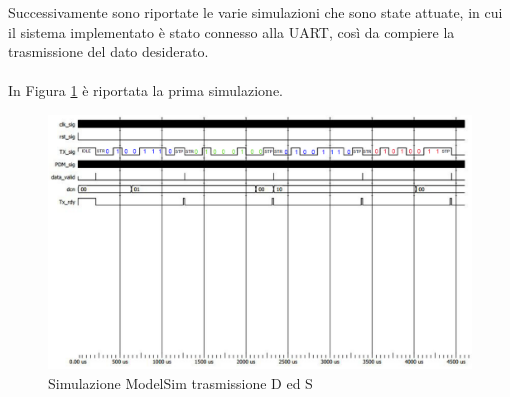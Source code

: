 \documentclass[a4paper, titlepage]{article}
\begin{document}
\noindent Successivamente sono riportate le varie simulazioni che sono state attuate, in cui il sistema implementato è stato connesso alla UART, così da compiere la trasmissione del dato desiderato.\\\\
In Figura \ref{fig:dx_sx} è riportata la prima simulazione.
\begin{figure}[H]
    \centering
    \includegraphics[width=1\textwidth]{dx_sx.PNG}
    \caption{Simulazione ModelSim trasmissione D ed S}
    \label{fig:dx_sx}
\end{figure}
\end{document}

